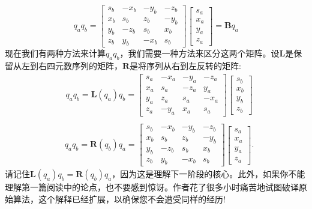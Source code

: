 $$
q_{a} q_{b}=\begin{bmatrix}
s_{b} & -x_{b} & -y_{b} & -z_{b} \\
x_{b} & s_{b} & z_{b} & -y_{b} \\
y_{b} & -z_{b} & s_{b} & x_{b} \\
z_{b} & y_{b} & -x_{b} & s_{b}
\end{bmatrix}\begin{bmatrix}
s_{a} \\
x_{a} \\
y_{a} \\
z_{a}
\end{bmatrix}=\mathbf{B} q_{a}
$$
现在我们有两种方法来计算$q_{a} q_{b}$，我们需要一种方法来区分这两个矩阵。设$\mathbf{L}$是保留从左到右四元数序列的矩阵，$\mathbf{R}$是将序列从右到左反转的矩阵:
$$
\begin{aligned}
& q_{a} q_{b}=\mathbf{L}\left(q_{a}\right) q_{b}= {\left[\begin{array}{cccc}
s_{a} & -x_{a} & -y_{a} & -z_{a} \\
x_{a} & s_{a} & -z_{a} & y_{a} \\
y_{a} & z_{a} & s_{a} & -x_{a} \\
z_{a} & -y_{a} & x_{a} & s_{a}
\end{array}\right]\left[\begin{array}{c}
s_{b} \\
x_{b} \\
y_{b} \\
z_{b}
\end{array}\right] } \\
\end{aligned}
$$
$$
\begin{aligned}
& q_{a} q_{b}=\mathbf{R}\left(q_{b}\right) q_{a}=\left[\begin{array}{cccc}
s_{b} & -x_{b} & -y_{b} & -z_{b} \\
x_{b} & s_{b} & z_{b} & -y_{b} \\
y_{b} & -z_{b} & s_{b} & x_{b} \\
z_{b} & y_{b} & -x_{b} & s_{b}
\end{array}\right]\left[\begin{array}{c}
s_{a} \\
x_{a} \\
y_{a} \\
z_{a}
\end{array}\right] .
\end{aligned}
$$
请记住$\mathbf{L}\left(q_{a}\right) q_{b}=\mathbf{R}\left(q_{b}\right) q_{a}$，因为这是理解下一阶段的核心。此外，如果你不能理解第一篇阅读中的论点，也不要感到惊讶。作者花了很多小时痛苦地试图破译原始算法，这个解释已经扩展，以确保您不会遭受同样的经历!

